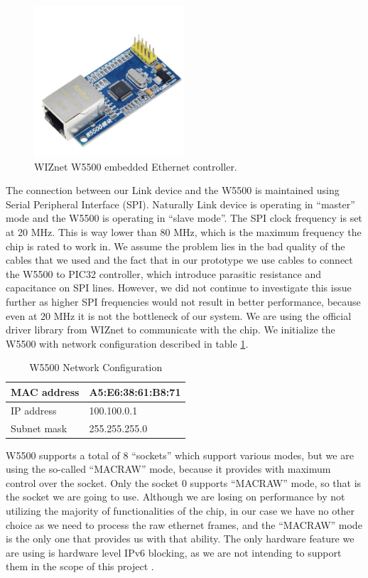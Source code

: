 \begin{figure}[htp]
\begin{center}
\includegraphics[width=0.5\textwidth]{w5500}
\end{center}
\caption{WIZnet W5500 embedded Ethernet controller.}
\label{ethernet-port}
\end{figure}

The connection between our Link device and the W5500 is maintained using Serial Peripheral Interface (SPI). Naturally Link device is operating in “master” mode and the W5500 is operating in “slave mode”. The SPI clock frequency is set at 20 MHz. This is way lower than 80 MHz, which is the maximum frequency the chip is rated to work in. We assume the problem lies in the bad quality of the cables that we used and the fact that in our prototype we use cables to connect the W5500 to PIC32 controller, which introduce parasitic resistance and capacitance on SPI lines. However, we did not continue to investigate this issue further as higher SPI frequencies would not result in better performance, because even at 20 MHz it is not the bottleneck of our system.
We are using the official driver library from WIZnet to communicate with the chip. We initialize the W5500 with network configuration described in table \ref{w5500-net-conf}.

\begin{table}
\centering
\caption{W5500 Network Configuration}
\label{w5500-net-conf}
\begin{tabular}{|l|l|}
\hline 
MAC address & A5:E6:38:61:B8:71 \\ \hline
IP address & 100.100.0.1 \\ \hline
Subnet mask & 255.255.255.0 \\ \hline
\end{tabular}
\end{table}

W5500 supports a total of 8 “sockets” which support various modes, but we are using the so-called “MACRAW” mode, because it provides with maximum control over the socket. Only the socket 0 supports “MACRAW” mode, so that is the socket we are going to use. Although we are losing on performance by not utilizing the majority of functionalities of the chip, in our case we have no other choice as we need to process the raw ethernet frames, and the “MACRAW” mode is the only one that provides us with that ability. The only hardware feature we are using is hardware level IPv6 blocking, as we are not intending to support them in the scope of this project \cite{w5500}.

